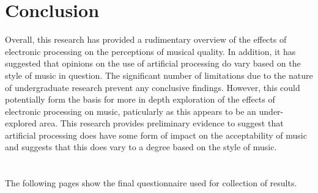 \documentclass[titlepage]{scrartcl}
\begin{document}
    \section{Conclusion}
    Overall, this research has provided a rudimentary overview of the effects
    of electronic processing on the perceptions of musical quality. In
    addition, it has suggested that opinions on the use of artificial
    processing do vary based on the style of music in question. The significant
    number of limitations due to the nature of undergraduate research prevent
    any conclusive findings. However, this could potentially form the basis for
    more in depth exploration of the effects of electronic processing on music,
    paticularly as this appears to be an under-explored area.
    This research provides preliminary evidence to suggest that artificial
    processing does have some form of impact on the acceptability of music and
    suggests that this does vary to a degree based on the style of music.
    
    \printbibliography

    \appendix
    \gdef\thesection{\centerline{Appendix \Alph{section}}}
    \section{}
    The following pages show the final questionnaire used for collection of results. 
    
\end{document}
